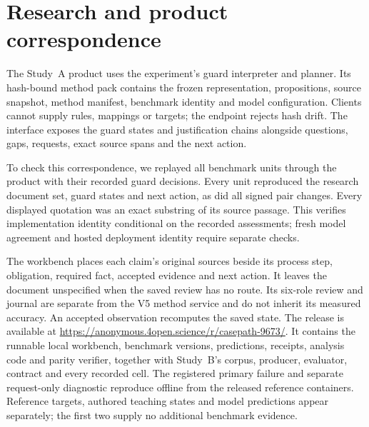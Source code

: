 \section{Research and product correspondence}
\label{sec:release}

The Study~A product uses the experiment's guard interpreter and planner.
Its hash-bound method pack contains the frozen representation,
propositions, source snapshot, method manifest, benchmark identity and
model configuration. Clients cannot supply rules, mappings or targets;
the endpoint rejects hash drift. The interface exposes the guard states
and justification chains alongside questions, gaps, requests, exact source
spans and the next action.

To check this correspondence, we replayed all \parityUnits{} benchmark
units through the product with their recorded guard decisions. Every
unit reproduced the research document set, guard states and next action,
as did all \parityPairs{} signed pair changes. Every displayed quotation
was an exact substring of its source passage. This verifies implementation
identity conditional on the recorded assessments; fresh model agreement
and hosted deployment identity require separate checks.

The workbench places each claim's original sources beside its process step,
obligation, required fact, accepted evidence and next action. It leaves the
document unspecified when the saved review has no route. Its six-role review
and journal are separate from the V5 method service and do not inherit its
measured accuracy. An accepted observation recomputes the saved state. The release
is available at \url{https://anonymous.4open.science/r/casepath-9673/}.
It contains the runnable local workbench, benchmark versions, predictions,
receipts, analysis code and parity verifier, together with Study~B's corpus,
producer, evaluator, contract and every recorded cell. The registered primary
failure and separate request-only diagnostic reproduce offline from the released
reference containers. Reference targets, authored teaching states and model
predictions appear separately; the first two supply no additional benchmark
evidence.
